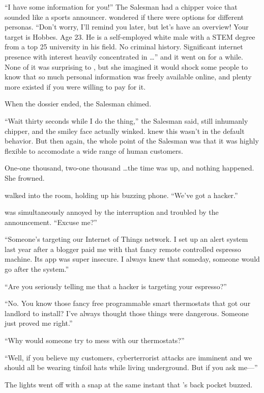 ``I have some information for you!'' The Salesman had a chipper voice that sounded like a sports announcer. {\protag} wondered if there were options for different personas. ``Don't worry, I'll remind you later, but let's have an overview! Your target is {\sidetag} Hobbes. Age 23. He is a self-employed white male with a STEM degree from a top 25 university in his field. No criminal history. Significant internet presence with interest heavily concentrated in \dots'' and it went on for a while. None of it was surprising to {\protag}, but she imagined it would shock some people to know that so much personal information was freely available online, and plenty more existed if you were willing to pay for it.

When the dossier ended, the Salesman chimed.

``Wait thirty seconds while I do the thing,'' the Salesman said, still inhumanly chipper, and the smiley face actually winked. {\protag} knew this wasn't in the default behavior. But then again, the whole point of the Salesman was that it was highly flexible to accomodate a wide range of human customers.

One-one thousand, two-one thousand \dots the time was up, and nothing happened. She frowned. 

{\sidetag} walked into the room, holding up his buzzing phone. ``We've got a hacker.''

{\protag} was simultaneously annoyed by the interruption and troubled by the announcement. ``Excuse me?''

``Someone’s targeting our Internet of Things network. I set up an alert system last year after a blogger paid me with that fancy remote controlled espresso machine. Its app was super insecure. I always knew that someday, someone would go after the system.''

``Are you seriously telling me that a hacker is targeting your espresso?''

``No. You know those fancy free programmable smart thermostats that \crunchyCity{} got our landlord to install? I've always thought those things were dangerous. Someone just proved me right.''

``Why would someone try to mess with our thermostats?''

``Well, if you believe my customers, cyberterrorist attacks are imminent and we should all be wearing tinfoil hats while living underground. But if you ask me---''

The lights went off with a snap at the same instant that {\protag}'s back pocket buzzed.

